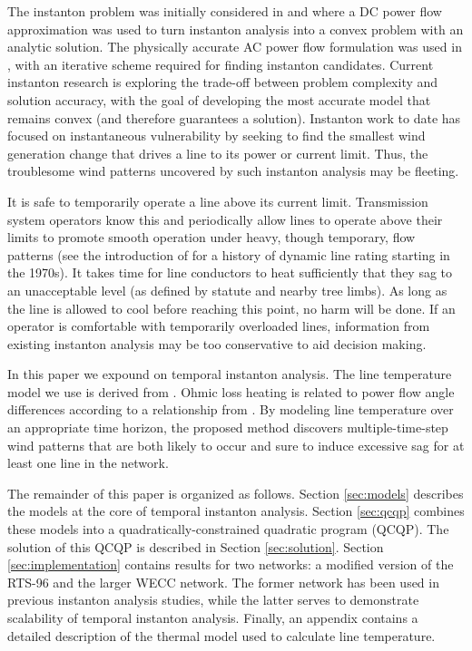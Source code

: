 \documentclass[conference]{IEEEtran}
\begin{document}
The instanton problem was initially considered in \cite{chertkov2011}
and \cite{chertkov2011a} where a DC power flow approximation was used
to turn instanton analysis into a convex problem with an analytic
solution. The physically accurate AC power flow formulation was used
in \cite{baghsorkhi2012}, with an iterative scheme required for
finding instanton candidates. Current instanton research is exploring
the trade-off between problem complexity and solution accuracy, with
the goal of developing the most accurate model that remains convex
(and therefore guarantees a solution).  Instanton work to date has
focused on instantaneous vulnerability by seeking to find the smallest
wind generation change that drives a line to its power or current
limit. Thus, the troublesome wind patterns uncovered by such instanton
analysis may be fleeting.

It is safe to temporarily operate a line above its current
limit. Transmission system operators know this and periodically allow
lines to operate above their limits to promote smooth operation under
heavy, though temporary, flow patterns (see the introduction of
\cite{banakar2005} for a history of dynamic line rating starting in
the 1970s). It takes time for line conductors to heat sufficiently
that they sag to an unacceptable level (as defined by statute and
nearby tree limbs). As long as the line is allowed to cool before
reaching this point, no harm will be done. If an operator is
comfortable with temporarily overloaded lines, information from
existing instanton analysis may be too conservative to aid decision
making.

In this paper we expound on temporal instanton analysis. The line temperature model we use is derived from \cite{ieee2013}. Ohmic loss heating is related to power flow angle differences according to a relationship from \cite{almassalkhi2014}. By modeling line temperature over an appropriate time horizon, the proposed method discovers multiple-time-step wind patterns that are both likely to occur and sure to induce excessive sag for at least one line in the network.

The remainder of this paper is organized as follows. Section \ref{sec:models} describes the models at the core of temporal instanton analysis. Section \ref{sec:qcqp} combines these models into a quadratically-constrained quadratic program (QCQP). The solution of this QCQP is described in Section \ref{sec:solution}. Section \ref{sec:implementation}  contains results for two networks: a modified version of the RTS-96 and the larger WECC network. The former network has been used in previous instanton analysis studies, while the latter serves to demonstrate scalability of temporal instanton analysis. Finally, an appendix contains a detailed description of the thermal model used to calculate line temperature.
\end{document}
